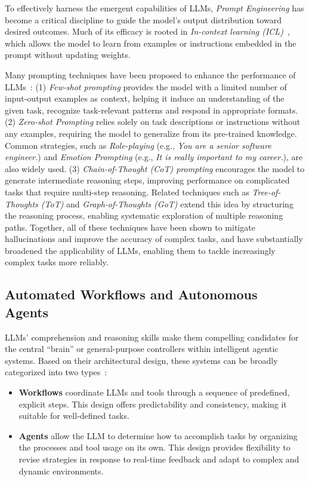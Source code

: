 To effectively harness the emergent capabilities of LLMs, \textit{Prompt Engineering} has become a critical discipline to guide the model's output distribution toward desired outcomes. Much of its efficacy is rooted in \textit{In-context learning (ICL)}~\cite{schulhoff2024prompt}, which allows the model to learn from examples or instructions embedded in the prompt without updating weights. 

Many prompting techniques have been proposed to enhance the performance of LLMs~\cite{sahoo2024systematic}: (1) \textit{Few-shot prompting} provides the model with a limited number of input-output examples as context, helping it induce an understanding of the given task, recognize task-relevant patterns and respond in appropriate formats. (2) \textit{Zero-shot Prompting} relies solely on task descriptions or instructions without any examples, requiring the model to generalize from its pre-trained knowledge. Common strategies, such as \textit{Role-playing} (e.g., \textit{You are a senior software engineer.}) and \textit{Emotion Prompting} (e.g., \textit{It is really important to my career.}), are also widely used. (3) \textit{Chain-of-Thought (CoT) prompting} encourages the model to generate intermediate reasoning steps, improving performance on complicated tasks that require multi-step reasoning. Related techniques such as \textit{Tree-of-Thoughts (ToT)} and \textit{Graph-of-Thoughts (GoT)} extend this idea by structuring the reasoning process, enabling systematic exploration of multiple reasoning paths. Together, all of these techniques have been shown to mitigate hallucinations and improve the accuracy of complex tasks, and have substantially broadened the applicability of LLMs, enabling them to tackle increasingly complex tasks more reliably.


\subsection{Automated Workflows and Autonomous Agents}
LLMs' comprehension and reasoning skills make them compelling candidates for the central ``brain'' or general-purpose controllers within intelligent agentic systems. Based on their architectural design, these systems can be broadly categorized into two types~\cite{effetive_agents}:
\begin{itemize}
    \item \textbf{Workflows} coordinate LLMs and tools through a sequence of predefined, explicit steps. This design offers predictability and consistency, making it suitable for well-defined tasks.
    \item \textbf{Agents} allow the LLM to determine how to accomplish tasks by organizing the processes and tool usage on its own. This design provides flexibility to revise strategies in response to real-time feedback and adapt to complex and dynamic environments.
\end{itemize}

